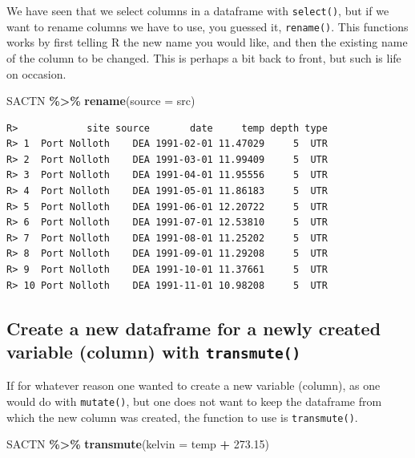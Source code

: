 \documentclass[
]{book}
\newenvironment{Shaded}{\begin{snugshade}}{\end{snugshade}}
\newcommand{\DataTypeTok}[1]{\textcolor[rgb]{0.13,0.29,0.53}{#1}}
\newcommand{\FloatTok}[1]{\textcolor[rgb]{0.00,0.00,0.81}{#1}}
\newcommand{\KeywordTok}[1]{\textcolor[rgb]{0.13,0.29,0.53}{\textbf{#1}}}
\newcommand{\NormalTok}[1]{#1}
\newcommand{\OperatorTok}[1]{\textcolor[rgb]{0.81,0.36,0.00}{\textbf{#1}}}
\newcommand{\StringTok}[1]{\textcolor[rgb]{0.31,0.60,0.02}{#1}}
\begin{document}
We have seen that we select columns in a dataframe with \texttt{select()}, but if we want to rename columns we have to use, you guessed it, \texttt{rename()}. This functions works by first telling R the new name you would like, and then the existing name of the column to be changed. This is perhaps a bit back to front, but such is life on occasion.

\begin{Shaded}
\begin{Highlighting}[]
\NormalTok{SACTN }\OperatorTok{\%>\%}\StringTok{ }
\StringTok{  }\KeywordTok{rename}\NormalTok{(}\DataTypeTok{source =}\NormalTok{ src)}
\end{Highlighting}
\end{Shaded}

\begin{verbatim}
R>            site source       date     temp depth type
R> 1  Port Nolloth    DEA 1991-02-01 11.47029     5  UTR
R> 2  Port Nolloth    DEA 1991-03-01 11.99409     5  UTR
R> 3  Port Nolloth    DEA 1991-04-01 11.95556     5  UTR
R> 4  Port Nolloth    DEA 1991-05-01 11.86183     5  UTR
R> 5  Port Nolloth    DEA 1991-06-01 12.20722     5  UTR
R> 6  Port Nolloth    DEA 1991-07-01 12.53810     5  UTR
R> 7  Port Nolloth    DEA 1991-08-01 11.25202     5  UTR
R> 8  Port Nolloth    DEA 1991-09-01 11.29208     5  UTR
R> 9  Port Nolloth    DEA 1991-10-01 11.37661     5  UTR
R> 10 Port Nolloth    DEA 1991-11-01 10.98208     5  UTR
\end{verbatim}

\hypertarget{create-a-new-dataframe-for-a-newly-created-variable-column-with-transmute}{%
\subsection{\texorpdfstring{Create a new dataframe for a newly created variable (column) with \texttt{transmute()}}{Create a new dataframe for a newly created variable (column) with transmute()}}\label{create-a-new-dataframe-for-a-newly-created-variable-column-with-transmute}}

If for whatever reason one wanted to create a new variable (column), as one would do with \texttt{mutate()}, but one does not want to keep the dataframe from which the new column was created, the function to use is \texttt{transmute()}.

\begin{Shaded}
\begin{Highlighting}[]
\NormalTok{SACTN }\OperatorTok{\%>\%}\StringTok{ }
\StringTok{  }\KeywordTok{transmute}\NormalTok{(}\DataTypeTok{kelvin =}\NormalTok{ temp }\OperatorTok{+}\StringTok{ }\FloatTok{273.15}\NormalTok{)}
\end{Highlighting}
\end{Shaded}
\end{document}
